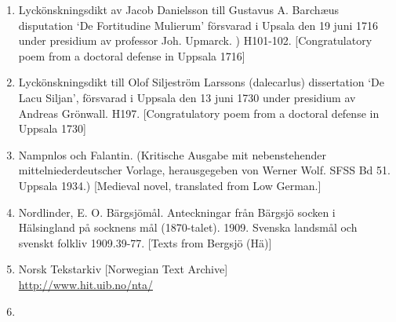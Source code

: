 \begin{enumerate}

\item[\sqbrSenum]

\label{bkm:Ref154213694}Lyckönskningsdikt av Jacob Danielsson till Gustavus A. Barchæus disputation ‘De Fortitudine Mulierum’ försvarad i Upsala den 19 juni 1716 under presidium av professor Joh. Upmarck. ) H101-102. [Congratulatory poem from a doctoral defense in Uppsala 1716]

\item[\sqbrSenum]

\label{bkm:Ref160604331}Lyckönskningsdikt till Olof Siljeström Larssons (dalecarlus) dissertation ‘De Lacu Siljan’, försvarad i Uppsala den 13 juni 1730 under presidium av Andreas Grönwall. H197. [Congratulatory poem from a doctoral defense in Uppsala 1730]


\item[\sqbrSenum]

\label{bkm:Ref155341402}Nampnlos och Falantin. (Kritische Ausgabe mit nebenstehender mittelniederdeutscher Vorlage, herausgegeben von Werner Wolf. SFSS Bd 51. Uppsala 1934.) [Medieval novel, translated from Low German.]

\item[\sqbrSenum]

\label{bkm:Ref154203595}Nordlinder, E. O. Bärgsjömål. Anteckningar från Bärgsjö socken i Hälsingland på socknens mål (1870-talet). 1909. Svenska landsmål och svenskt folkliv 1909.39-77. [Texts from Bergsjö (Hä)]


\item[\sqbrSenum]

\label{bkm:Ref137882336}Norsk Tekstarkiv [Norwegian Text Archive]\\
\url{http://www.hit.uib.no/nta/}

\item[\sqbrSenum]


\end{enumerate}
